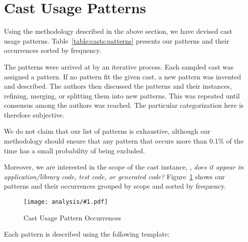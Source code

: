 \section{Cast Usage Patterns}\label{sec:casts:patterns}

Using the methodology described in the above section,
we have devised \nPattern{} cast usage patterns.
Table~\ref{table:casts:patterns} presents our patterns and their
occurrences sorted by frequency.




The patterns were arrived at by an iterative process.
Each sampled cast was assigned a pattern.
If no pattern fit the given cast,
a new pattern was invented and described.
The authors then discussed the patterns and their instances,
refining, merging, or splitting them into new patterns.
This was repeated until consensus among the authors was reached.
The particular categorization here is therefore subjective.

We do not claim that our list of patterns is exhaustive,
although our methodology should ensure that any pattern that occurs more
than 0.1\% of the time has a small probability of being excluded.

Moreover, we are interested in the scope of the cast instance,
\ie, \emph{does it appear in application/library code, test code, or generated code?}
Figure~\ref{fig:casts:patterns} shows our patterns and their occurrences grouped by scope and sorted by frequency.

\newcommand\plot[3]{
\begin{figure}[ht!]
\centering
\texttt{[image: analysis/\#1.pdf]}
\caption{#3} \label{#2}
\end{figure}
}

\plot{table-patterns}{fig:casts:patterns}{Cast Usage Pattern Occurrences}

Each pattern is described using the following template:

